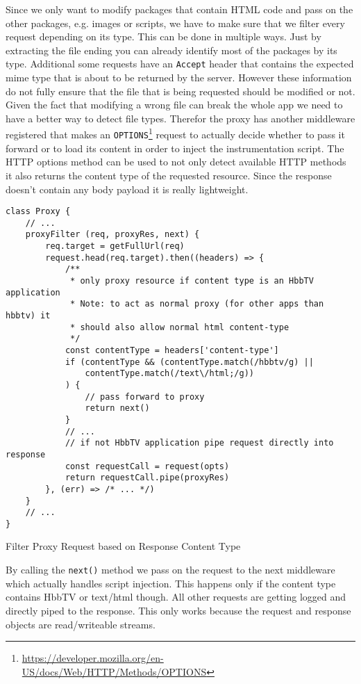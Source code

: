 Since we only want to modify packages that contain HTML code and pass on the other packages, e.g. images
or scripts, we have to make sure that we filter every request depending on its type. This can be done in
multiple ways. Just by extracting the file ending you can already identify most of the packages by its
type. Additional some requests have an \texttt{Accept} header that contains the expected mime type that
is about to be returned by the server. However these information do not fully ensure that the file that
is being requested should be modified or not. Given the fact that modifying a wrong file can break the
whole app we need to have a better way to detect file types. Therefor the proxy has another middleware
registered that makes an \texttt{OPTIONS}\footnote{\url{https://developer.mozilla.org/en-US/docs/Web/HTTP/Methods/OPTIONS}}
request to actually decide whether to pass it forward or to load its content in order to inject the
instrumentation script. The HTTP options method can be used to not only detect available HTTP methods
it also returns the content type of the requested resource. Since the response doesn't contain any body
payload it is really lightweight.

\begin{listing}[H]
\begin{verbatim}
class Proxy {
    // ...
    proxyFilter (req, proxyRes, next) {
        req.target = getFullUrl(req)
        request.head(req.target).then((headers) => {
            /**
             * only proxy resource if content type is an HbbTV application
             * Note: to act as normal proxy (for other apps than hbbtv) it
             * should also allow normal html content-type
             */
            const contentType = headers['content-type']
            if (contentType && (contentType.match(/hbbtv/g) ||
                contentType.match(/text\/html;/g))
            ) {
                // pass forward to proxy
                return next()
            }
            // ...
            // if not HbbTV application pipe request directly into response
            const requestCall = request(opts)
            return requestCall.pipe(proxyRes)
        }, (err) => /* ... */)
    }
    // ...
}
\end{verbatim}
\caption{Filter Proxy Request based on Response Content Type}
\label{lst:proxyFilter}
\end{listing}

By calling the \texttt{next()} method we pass on the request to the next middleware which actually handles
script injection. This happens only if the content type contains HbbTV or text/html though. All other
requests are getting logged and directly piped to the response. This only works because the request and
response objects are read/writeable streams.

